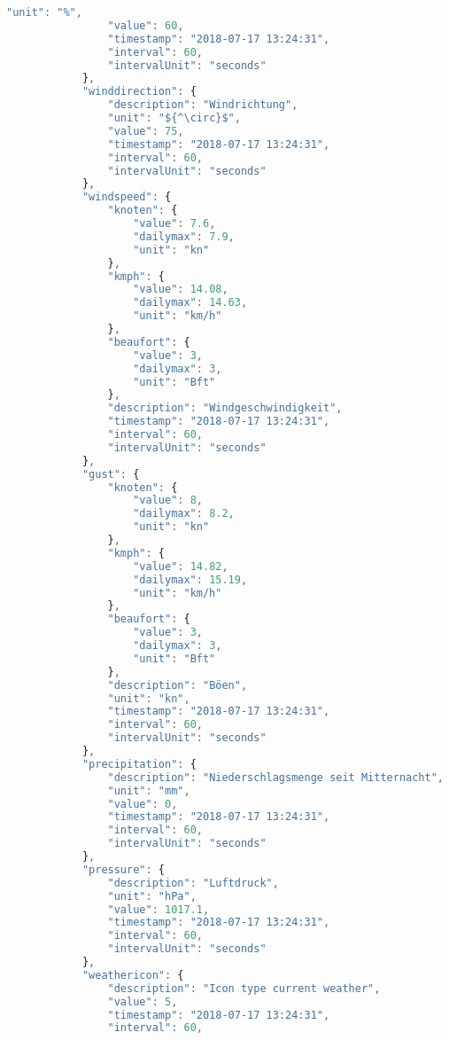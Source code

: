 \begin{lstlisting}[label=lst:JsonTree,caption=Json Struktur, language=JavaScript, style=htmlcssjs, mathescape]
                "unit": "%",
                "value": 60,
                "timestamp": "2018-07-17 13:24:31",
                "interval": 60,
                "intervalUnit": "seconds"
            },
            "winddirection": {
                "description": "Windrichtung",
                "unit": "${^\circ}$",
                "value": 75,
                "timestamp": "2018-07-17 13:24:31",
                "interval": 60,
                "intervalUnit": "seconds"
            },
            "windspeed": {
                "knoten": {
                    "value": 7.6,
                    "dailymax": 7.9,
                    "unit": "kn"
                },
                "kmph": {
                    "value": 14.08,
                    "dailymax": 14.63,
                    "unit": "km/h"
                },
                "beaufort": {
                    "value": 3,
                    "dailymax": 3,
                    "unit": "Bft"
                },
                "description": "Windgeschwindigkeit",
                "timestamp": "2018-07-17 13:24:31",
                "interval": 60,
                "intervalUnit": "seconds"
            },
            "gust": {
                "knoten": {
                    "value": 8,
                    "dailymax": 8.2,
                    "unit": "kn"
                },
                "kmph": {
                    "value": 14.82,
                    "dailymax": 15.19,
                    "unit": "km/h"
                },
                "beaufort": {
                    "value": 3,
                    "dailymax": 3,
                    "unit": "Bft"
                },
                "description": "Böen",
                "unit": "kn",
                "timestamp": "2018-07-17 13:24:31",
                "interval": 60,
                "intervalUnit": "seconds"
            },
            "precipitation": {
                "description": "Niederschlagsmenge seit Mitternacht",
                "unit": "mm",
                "value": 0,
                "timestamp": "2018-07-17 13:24:31",
                "interval": 60,
                "intervalUnit": "seconds"
            },
            "pressure": {
                "description": "Luftdruck",
                "unit": "hPa",
                "value": 1017.1,
                "timestamp": "2018-07-17 13:24:31",
                "interval": 60,
                "intervalUnit": "seconds"
            },
            "weathericon": {
                "description": "Icon type current weather",
                "value": 5,
                "timestamp": "2018-07-17 13:24:31",
                "interval": 60,

\end{lstlisting}

